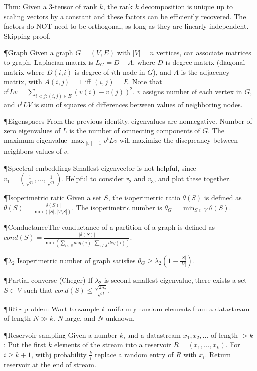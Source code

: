 \documentclass[8pt]{article}
\newlength{\sm}
\begin{document}
Thm: Given a 3-tensor of rank $k$, the rank $k$ decomposition is unique up to scaling vectors by a constant and these factors can be efficiently recovered. The factors do NOT need to be orthogonal, as long as they are linearly independent.  Skipping proof.




  \P{Graph} Given a graph $G = (V, E)$ with $|V| = n$ vertices, can associate matrices to graph.  Laplacian matrix is $L_G = D - A$, where $D$ is degree matrix (diagonal matrix where $D(i, i)$ is degree of $i$th node in $G$), and $A$ is the adjacency matrix, with $A(i, j) = 1$ iff $(i, j) = E$.  Note that $v^t L v = \sum_{i < j: (i, j) \in E} (v(i) - v(j))^2$.  $v$ assigns number of each vertex in $G$, and $v^t L V$ is sum of squares of differences between values of neighboring nodes.

  \P{Eigenspaces} From the previous identity, eigenvalues are nonnegative.  Number of zero eigenvalues of $L$ is the number of connecting components of $G$.  The maximum eigenvalue $\max_{||v||=1} v^t L v$ will maximize the discpreancy between neighbors values of $v$.

  \P{Spectral embeddings} Smallest eigenvector is not helpful, since $v_1 = (\frac{1}{\sqrt{n}}, \dots, \frac{1}{\sqrt{n}})$.  Helpful to consider $v_2$ and $v_3$, and plot these together.

  \P{Isoperimetric ratio} Given a set $S$, the isoperimetric ratio $\theta(S)$ is defined as  $\theta(S) = \frac{|\delta(S)|}{\min(|S|, |V \setminus S|)}$.  The isoperimetric number is $\theta_G = \min_{S \subset V} \theta(S)$.  
  
  \P{Conductance}The conductance of a partition of a graph is defined as $cond(S) = \frac{|\delta(S)|}{\min (\sum_{i \in S} deg(i), \sum_{i \not \in S} deg(i))}$.

  \P{$\lambda_2$} Isoperimetric number of graph satisfies $\theta_G \geq \lambda_2 (1 - \frac{|S|}{|V|})$.

  \P{Partial converse (Cheger)} If $\lambda_2$ is second smallest eigenvalue, there exists a set $S \subset V$ such that $cond(S) \leq \frac{\sqrt{2 \lambda_2}}{\sqrt{d}}$.


  \P{RS - problem} Want to sample $k$ uniformly random elements from a datastream of length $N \gg k$.  $N$ large, and $N$ unknown.
  
  \P{Reservoir sampling} Given a number $k$, and a datastream $x_1, x_2, \dots $ of length $> k$:  Put the first $k$ elements of the stream into a reservoir $R = (x_1, \dots, x_k)$.  For $i \geq k+1$, withj probability $\frac{k}{i}$ replace a random entry of $R$ with $x_i$.  Return reservoir at the end of stream.
\end{document}
